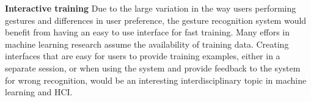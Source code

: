 \textbf{Interactive training} Due to the large variation in the way users
performing gestures and differences in user preference, the gesture recognition
system would benefit from having an easy to use interface for fast training.
Many effors in machine learning research assume the availability of
training data. Creating interfaces that are easy for users to provide training examples, either in a
separate session, or when using the system and provide feedback to the system
for wrong recognition, would be an interesting interdisciplinary topic in
machine learning and HCI.
